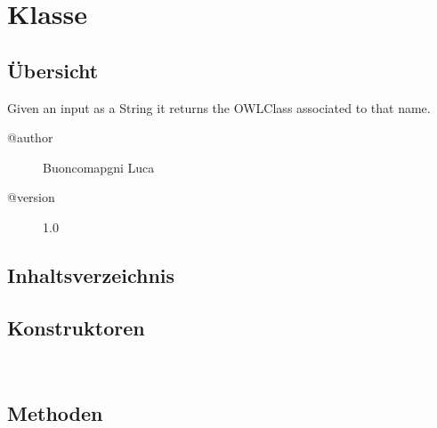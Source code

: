 
\section[AsOWLClass]{Klasse }\label{ontologyFramework.OFEventManagement.OFEventParameter.AsOWLClass-class}
\subsection{Übersicht}
Given an input as a String it returns the OWLClass associated to that name.
\begin{description}
\item[@author] 
Buoncomapgni Luca
\item[@version] 
1.0
\end{description}
\subsection{Inhaltsverzeichnis}
\subsection{Konstruktoren}
\begin{description}
\item[{\label{ontologyFramework.OFEventManagement.OFEventParameter.AsOWLClass()}}]
~ 
\end{description}
\subsection{Methoden}
\begin{description}
\item[{\label{ontologyFramework.OFEventManagement.OFEventParameter.AsOWLClass.getParameter(java.lang.Object,ontologyFramework.OFContextManagement.OWLReferences)}}]
~ 
\end{description}
